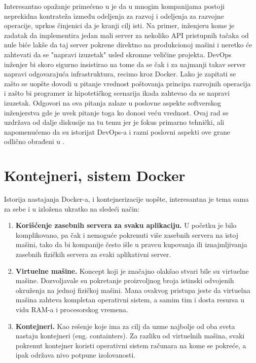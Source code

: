 \documentclass[12pt,oneside]{memoir}
\begin{document}
Interesantno opažanje primećeno u \cite{devopshandbook} je da u mnogim kompanijama postoji neprekidna kontrateža između odeljenja za razvoj i odeljenja za razvojne operacije, uprkos činjenici da je kranji cilj isti. Na primer, inženjeru kome je zadatak da implementira jedan mali server za nekoliko API pristupnih tačaka od nule biće lakše da taj server pokrene direktno na produkcionoj mašini i neretko će zahtevati da se "napravi izuzetak" usled skromne veličine projekta. DevOps inženjer bi skoro sigurno insistirao na tome da se čak i za najmanji takav server napravi odgovarajuća infrastruktura, recimo kroz Docker. Lako je zapitati se zašto se uopšte dovodi u pitanje vrednost poštovanja principa razvojnih operacija i zašto bi programer iz hipotetičkog scenarija ikada zahtevao da se napravi izuzetak. Odgovori na ova pitanja zalaze u poslovne aspekte softverskog inženjerstva gde je uvek pitanje toga ko donosi veću vrednost. Ovaj rad se uzdržava od dalje diskusije na tu temu jer je fokus primarno tehnički, ali napomenućemo da su istorijat DevOps-a i razni poslovni aspekti ove grane odlično obrađeni u \cite{devopshandbook}.


\section{Kontejneri, sistem Docker}

Istorija nastajanja Docker-a, i kontejnerizacije uopšte, interesantna je tema sama za sebe i u \cite{dockerdeepdive} izložena ukratko na sledeći način:
\begin{enumerate}
    \item \textbf{Korišćenje zasebnih servera za svaku aplikaciju.} U početku je bilo komplikovano, pa čak i nemoguće pokrenuti više zasebnih servera na istoj mašini, tako da bi kompanije često išle u pravcu kupovanja ili iznajmljivanja zasebnih fizičkih servera za svaki aplikativni server.
    \item \textbf{Virtuelne mašine.} Koncept koji je značajno olakšao stvari bile su virtuelne mašine. Dozvoljavale su pokretanje proizvoljnog broja istinski odvojenih okruženja na jednoj fizičkoj mašini. Mana ovakvog pristupa jeste da virtuelna mašina zahteva kompletan operativni sistem, a samim tim i dosta resursa u vidu RAM-a i procesorskog vremena.
    \item \textbf{Kontejneri.} Kao rešenje koje ima za cilj da uzme najbolje od oba sveta nastaju kontejneri (eng. containters). Za razliku od virtuelnih mašina, svaki pokrenut kontejner koristi operativni sistem računara na kome se pokreće, a ipak održava nivo potpune izolovanosti.
\end{enumerate}
\end{document}

